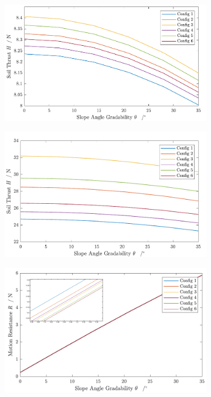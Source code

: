 \begin{figure}[htb]
     \centering
     \begin{subfigure}[b]{0.49\textwidth}
         \centering
         \includegraphics[width=\textwidth]{Media/Soil Thrust Heavy Clay.pdf}
         \label{fig:trappedelectronsEarth}
     \end{subfigure}
     \hfill
     \begin{subfigure}[b]{0.49\textwidth}
         \centering
         \includegraphics[width=\textwidth]{Media/Soil Thrust Snow.pdf}
         \label{fig:trappedprotonsEarth}
     \end{subfigure}
     \hfill
     \begin{subfigure}[b]{0.49\textwidth}
         \centering
         \includegraphics[width=\textwidth]{Media/ResistanceHeavyClay.pdf}

\end{subfigure}
\end{figure}
